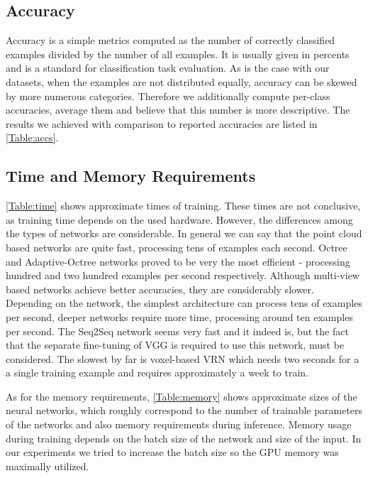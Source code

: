 \subsection{Accuracy}
Accuracy is a simple metrics computed as the number of correctly classified examples divided by the number of all examples. It is usually given in percents and is a standard for classification task evaluation. As is the case with our datasets, when the examples are not distributed equally, accuracy can be skewed by more numerous categories. Therefore we additionally compute per-class accuracies, average them and believe that this number is more descriptive. The results we achieved with comparison to reported accuracies are listed in \autoref{Table:accs}. 


\subsection{Time and Memory Requirements}
\autoref{Table:time} shows approximate times of training. These times are not conclusive, as training time depends on the used hardware. However, the differences among the types of networks are considerable. In general we can say that the point cloud based networks are quite fast, processing tens of examples each second. Octree and Adaptive-Octree networks proved to be very the most efficient - processing hundred and two hundred examples per second respectively. Although multi-view based networks achieve better accuracies, they are considerably slower. Depending on the network, the simplest architecture can process tens of examples per second, deeper networks require more time, processing around ten examples per second. The Seq2Seq network seems very fast and it indeed is, but the fact that the separate fine-tuning of VGG is required to use this network, must be considered. The slowest by far is voxel-based VRN which needs two seconds for a a single training example and requires approximately a week to train. \par

As for the memory requirements, \autoref{Table:memory} shows approximate sizes of the neural networks, which roughly correspond to the number of trainable parameters of the networks and also memory requirements during inference. Memory usage during training depends on the batch size of the network and size of the input. In our experiments we tried to increase the batch size so the GPU memory was maximally utilized. 


